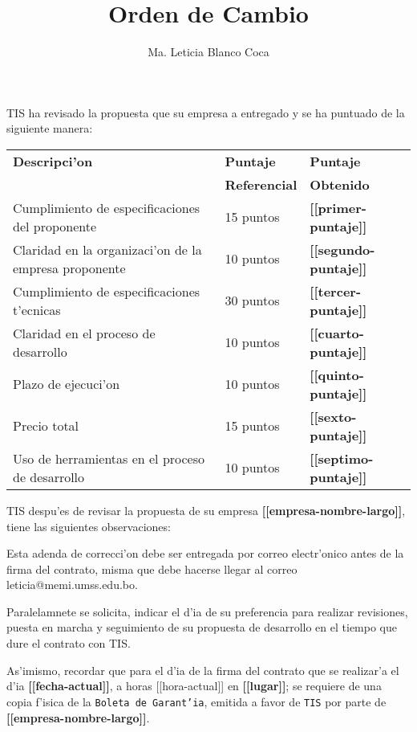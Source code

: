 \documentclass[10pt,letterpaper,twoside]{article}
\newcommand{\empresa}[0]{\textbf{[[empresa-nombre-largo]]}}
\newcommand{\diahora}[0]{\textbf{[[fecha-actual]]}, a horas [[hora-actual]] }
\newcommand{\lugar}[0]{\textbf{[[lugar]]}}
\newcommand{\pp}[0]{\textbf{[[primer-puntaje]]}}
\newcommand{\sep}[0]{\textbf{[[segundo-puntaje]]}}
\newcommand{\tp}[0]{\textbf{[[tercer-puntaje]]}}
\newcommand{\cp}[0]{\textbf{[[cuarto-puntaje]]}}
\newcommand{\qp}[0]{\textbf{[[quinto-puntaje]]}}
\newcommand{\ssp}[0]{\textbf{[[sexto-puntaje]]}}
\newcommand{\sssp}[0]{\textbf{[[septimo-puntaje]]}}
\newcommand{\observaciones}[0]{\observacionesDetalle{[[obs-detalle-item]]}}
\begin{document}
\title{Orden de Cambio}
\author{Ma. Leticia Blanco Coca}
\maketitle


TIS ha revisado la propuesta que su empresa a entregado y se ha puntuado de la siguiente manera:

\begin{tabular}{|l|l|l|}
\hline \textbf{Descripci'on}& \textbf{Puntaje}&\textbf{Puntaje} \\
& \textbf{Referencial}&\textbf{Obtenido} \\
\hline Cumplimiento de especificaciones del proponente       & 15 puntos & \pp \\
\hline Claridad en la organizaci'on de la empresa proponente & 10 puntos & \sep \\
\hline Cumplimiento de especificaciones t'ecnicas            & 30 puntos & \tp \\ 
\hline Claridad en el proceso de desarrollo                  & 10 puntos & \cp \\
\hline Plazo de ejecuci'on                                   & 10 puntos & \qp \\
\hline Precio total                                          & 15 puntos & \ssp \\
\hline Uso de herramientas en el proceso de desarrollo       & 10 puntos & \sssp \\
\hline
\end{tabular}

TIS despu'es de revisar la propuesta de su empresa \empresa, tiene las siguientes observaciones:

\begin{enumerate}
\observaciones
\end{enumerate}

Esta adenda de correcci'on debe ser entregada por correo electr'onico antes de la firma del contrato, misma que debe hacerse llegar al correo leticia@memi.umss.edu.bo.


Paralelamnete se solicita, indicar el d'ia de su preferencia para realizar revisiones, puesta
en marcha  y 
seguimiento de su propuesta de desarrollo en el tiempo que dure el contrato con TIS.


As'imismo, recordar que para el d'ia de la firma del contrato que se realizar'a el d'ia \diahora en \lugar; se requiere de una copia f'isica
 de la 
\texttt{Boleta de Garant'ia}, emitida a favor de \texttt{TIS} por parte de \empresa.
\end{document}
